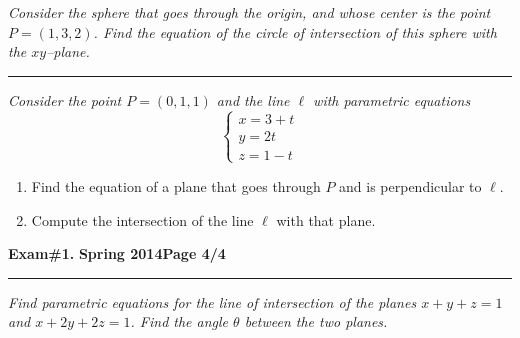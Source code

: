 \documentclass[12pt]{article}
\begin{document}
\bigskip
{\problem[15 pts] \em Consider the sphere that goes through the origin, and whose center is the point $P=(1,3,2)$.  Find the equation of the circle of intersection of this sphere with the $xy$--plane.} 
\vspace{5cm}
\begin{flushright}
\end{flushright}
\hrule
{\problem[10 pts] \em Consider the point $P=(0,1,1)$ and the line $\ell$ with parametric equations}
\begin{equation*}
\begin{cases}
x = 3+t \\ y = 2t \\ z = 1-t
\end{cases}
\end{equation*}
\begin{enumerate}
\item Find the equation of a plane that goes through $P$ and is perpendicular to $\ell$.
\vspace{2cm}
\begin{flushright}
\end{flushright}
\item  Compute the intersection of the line $\ell$ with that plane.
\vspace{3cm}
\begin{flushright}
\end{flushright}
\end{enumerate}
\newpage

\hfill{\large\bf Exam\#1.}\hfill{\large\bf
  Spring 2014}\hfill{\large\bf Page 4/4}\hrule

\bigskip
{\problem[20 pts] \em Find parametric equations for the line of intersection
of the planes $x+y+z=1$ and $x+2y+2z=1$.  Find the angle $\theta$ between the
two planes.}
\vspace{18.5cm}
\begin{flushright}
\end{flushright}
\end{document}
